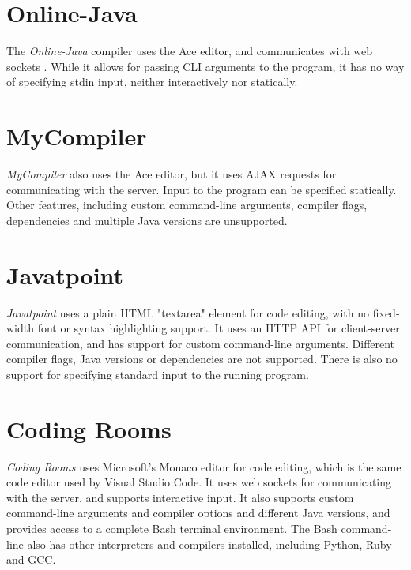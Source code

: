 \section{Online-Java}

The \emph{Online-Java} compiler uses the Ace editor, and communicates with web sockets \cite{online-ide-2022}. While it allows for passing CLI arguments to the program, it has no way of specifying stdin input, neither interactively nor statically.


\section{MyCompiler}

\emph{MyCompiler} \cite{mycompiler-2022} also uses the Ace editor, but it uses AJAX requests for communicating with the server. Input to the program can be specified statically. Other features, including custom command-line arguments, compiler flags, dependencies and multiple Java versions are unsupported.


\section{Javatpoint}

\emph{Javatpoint} \cite{javatpoint-2022} uses a plain HTML "textarea" element for code editing, with no fixed-width font or syntax highlighting support. It uses an HTTP API for client-server communication, and has support for custom command-line arguments. Different compiler flags, Java versions or dependencies are not supported. There is also no support for specifying standard input to the running program.


\section{Coding Rooms}

\emph{Coding Rooms} \cite{coding-rooms-2022} uses Microsoft's Monaco editor for code editing, which is the same code editor used by Visual Studio Code. It uses web sockets for communicating with the server, and supports interactive input. It also supports custom command-line arguments and compiler options and different Java versions, and provides access to a complete Bash terminal environment. The Bash command-line also has other interpreters and compilers installed, including Python, Ruby and GCC.

